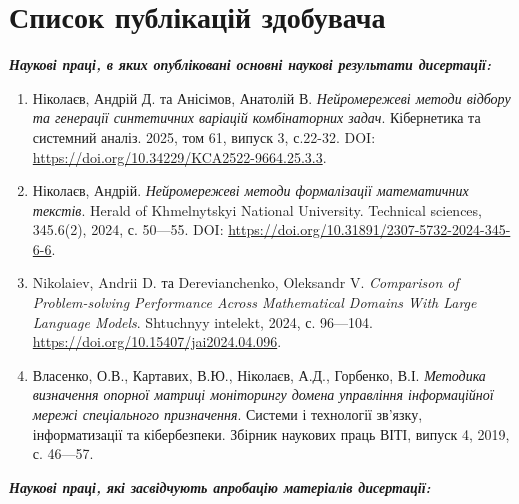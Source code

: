 \chapter*{Список публікацій здобувача}

\medskip
\textit{\textbf{Наукові праці, в яких опубліковані основні наукові результати дисертації:}}
\medskip

\begin{enumerate}
    \item Ніколаєв, Андрій Д. та Анісімов, Анатолій В. \textit{Нейромережеві методи відбору та генерації синтетичних варіацій комбінаторних задач}. Кібернетика та системний аналіз. 2025, том 61, випуск 3, с.22-32. DOI: \url{https://doi.org/10.34229/KCA2522-9664.25.3.3}.
    \item Ніколаєв, Андрій. \textit{Нейромережеві методи формалізації математичних текстів}. Herald of Khmelnytskyi National University. Technical sciences, 345.6(2), 2024, с. 50—55. DOI: \url{https://doi.org/10.31891/2307-5732-2024-345-6-6}.
    \item Nikolaiev, Andrii D. та Derevianchenko, Oleksandr V. \textit{Comparison of Problem-solving Performance Across Mathematical Domains With Large Language Models}. Shtuchnyy intelekt, 2024, с. 96—104. \url{https://doi.org/10.15407/jai2024.04.096}.
    \item Власенко, О.В., Картавих, В.Ю., Ніколаєв, А.Д., Горбенко, В.І. \textit{Методика визначення опорної матриці моніторингу домена управління інформаційної мережі спеціального призначення}. Системи і технології зв’язку, інформатизації та кібербезпеки. Збірник наукових праць ВІТІ, випуск 4, 2019, с. 46—57.
\end{enumerate}

\medskip
\textit{\textbf{Наукові праці, які засвідчують апробацію матеріалів дисертації:}}
\medskip

